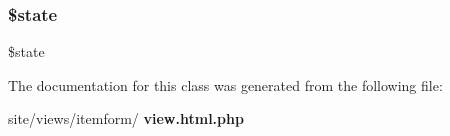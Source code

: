\mbox{\label{classtks__agenda_view_itemform_ae82306c4f2d17d8dd5c7d8d916b33bed}} 
\subsubsection{\$state}
{\footnotesize\ttfamily \$state\hspace{0.3cm}{\ttfamily [protected]}}



The documentation for this class was generated from the following file\+:\begin{DoxyCompactItemize}
\item 
site/views/itemform/\textbf{ view.\+html.\+php}\end{DoxyCompactItemize}
